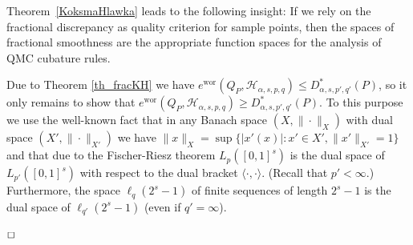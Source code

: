 \documentclass[12pt]{article}
\DeclareMathOperator{\wor}{wor}
\newenvironment{proof}{\begin{trivlist}
    \item[\hskip\labelsep{\it Proof.}]}{$\hfill\Box$\end{trivlist}}
\newcommand{\HH}{\mathcal{H}}
\begin{document}
Theorem~\ref{KoksmaHlawka} leads to the following insight: 
If we rely on the fractional discrepancy as quality criterion for sample points, then the spaces of fractional smoothness are the appropriate function spaces for the analysis of QMC cubature rules.

\begin{proof}
Due to Theorem \ref{th_fracKH} we have 
$e^{\wor}(Q_P,\HH_{\alpha,s,p,q}) \le D^\ast_{\alpha,s,p',q'}(P)$, 
so it only remains to show that
$e^{\wor}(Q_P,\HH_{\alpha,s,p,q}) \ge  D^\ast_{\alpha,s,p',q'}(P)$.
To this purpose we use the well-known fact that in any Banach space $(X, \|\cdot\|_X)$
with dual space $(X', \|\cdot\|_{X'})$ we have
$\|x\|_X = \sup\{|x'(x)|: x'\in X', \|x'\|_{X'}=1\}$ and that due to
the Fischer-Riesz theorem $L_p([0,1]^s)$ is the dual space of
$L_{p'}([0,1]^s)$
with respect to the dual bracket $\langle \cdot, \cdot \rangle$. (Recall
that $p'<\infty$.) Furthermore, the space $\ell_{q}(2^s-1)$ of finite sequences of length $2^s-1$ is the dual space of $\ell_{q'}(2^s-1)$ (even if $q'=\infty$).


\end{proof}
\end{document}

